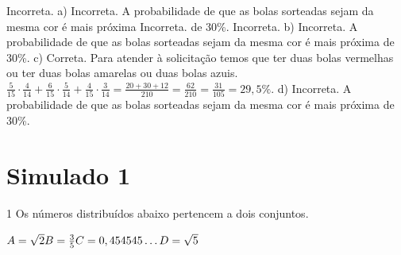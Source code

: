 \begin{escolha}
\begin{boxmedio}
\begin{boxmedio}
{\begin{boxpeq}
\begin{boxpeq}
{\begin{boxpeq}
\begin{boxmedio}
\begin{boxmedio}
\begin{boxpeq}
\begin{boxmedio}
\begin{boxpeq}
\begin{boxpeq}
\begin{boxpeq}
\begin{boxpeq}
\begin{boxmedio}
{\begin{boxmedio}
\begin{boxmedio}
\begin{boxpeq}
\begin{boxmedio}
\begin{boxpeq}
\begin{boxpeq}
\begin{boxpeq}
\begin{escolha}
{\begin{boxmedio}
\begin{boxpeq}
\begin{boxpeq}
\begin{boxpeq}
\begin{boxpeq}
\begin{boxpeq}
\begin{boxmedio}
\begin{boxpeq}
\begin{boxpeq}
\begin{boxpeq}
{\begin{boxpeq}
\begin{boxmedio}
\begin{boxpeq}
\begin{boxpeq}
\begin{boxpeq}
{\begin{boxpeq}
\begin{boxmedio}
{\begin{boxpeq}
\begin{boxpeq}
\begin{boxmedio}
\begin{boxmedio}
\begin{boxpeq}
\begin{boxpeq}
{\begin{boxpeq}
\begin{boxpeq}
\begin{boxpeq}
\begin{boxpeq}
\begin{boxpeq}
\begin{escolha}
\begin{escolha}
{\begin{boxmedio}
\begin{boxpeq}
\begin{q°}
\begin{boxmedio}
\begin{boxpeq}
\begin{boxpeq}
\begin{boxmedio}
\begin{boxmedio}
\begin{boxmedio}
\begin{boxmedio}
{\begin{enumerate}
\begin{boxpeq}
{\begin{boxpeq}
\begin{boxpeq}
\begin{boxmedio}
\begin{boxpeq}
\begin{boxpeq}
\begin{boxpeq}
{ Incorreta. a) Incorreta. A probabilidade de que as bolas sorteadas sejam da mesma cor é mais próxima Incorreta.  de 30\%.
 Incorreta. b) Incorreta. A probabilidade de que as bolas sorteadas sejam da mesma cor é mais próxima de 30\%.
c) Correta. Para atender à solicitação temos que ter duas bolas vermelhas ou ter
duas bolas amarelas ou duas bolas azuis. $\frac{5}{15} \cdot \frac{4}{14} + \frac{6}{15} \cdot \frac{5}{14} + \frac{4}{15} \cdot \frac{3}{14} = \frac{20 + 30 + 12}{210} = \frac{62}{210} = \frac{31}{105} = 29,5\%$.
d) Incorreta. A probabilidade de que as bolas sorteadas sejam da mesma cor é mais próxima de 30\%.}

\chapter{Simulado 1}

\num{1} Os números distribuídos abaixo pertencem a dois conjuntos.

$A = \sqrt{2} \\ 
B = \frac{3}{5} \\ 
C = 0,454545\ldots{} \\
D = \sqrt{5}$


\end{boxpeq}
\end{boxpeq}
\end{boxpeq}
\end{boxmedio}
\end{boxpeq}
\end{boxpeq}}
\end{boxpeq}
\end{enumerate}}
\end{boxmedio}
\end{boxmedio}
\end{boxmedio}
\end{boxmedio}
\end{boxpeq}
\end{boxpeq}
\end{boxmedio}
\end{q°}
\end{boxpeq}
\end{boxmedio}}
\end{escolha}
\end{escolha}
\end{boxpeq}
\end{boxpeq}
\end{boxpeq}
\end{boxpeq}
\end{boxpeq}}
\end{boxpeq}
\end{boxpeq}
\end{boxmedio}
\end{boxmedio}
\end{boxpeq}
\end{boxpeq}}
\end{boxmedio}
\end{boxpeq}}
\end{boxpeq}
\end{boxpeq}
\end{boxpeq}
\end{boxmedio}
\end{boxpeq}}
\end{boxpeq}
\end{boxpeq}
\end{boxpeq}
\end{boxmedio}
\end{boxpeq}
\end{boxpeq}
\end{boxpeq}
\end{boxpeq}
\end{boxpeq}
\end{boxmedio}}
\end{escolha}
\end{boxpeq}
\end{boxpeq}
\end{boxpeq}
\end{boxmedio}
\end{boxpeq}
\end{boxmedio}
\end{boxmedio}}
\end{boxmedio}
\end{boxpeq}
\end{boxpeq}
\end{boxpeq}
\end{boxpeq}
\end{boxmedio}
\end{boxpeq}
\end{boxmedio}
\end{boxmedio}
\end{boxpeq}}
\end{boxpeq}
\end{boxpeq}}
\end{boxmedio}
\end{boxmedio}
\end{escolha}
